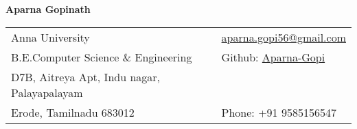 \documentclass[letterpaper,11pt,oneside]{article}
\newcommand*{\Github}{\href{https://github.com/Aparna-Gopi}{Aparna-Gopi}}
\newcommand{\Absender}[1][\normalsize]{\Github}
\begin{document}

\noindent  \LARGE{\textbf{Aparna Gopinath}}  \\
\vspace{-2ex}
\hline
\normalsize


\begin{center}
\begin{tabular}{l l}
 Anna University    & \hspace{1in} \href{mailto:aparna.gopi56@gmail.com}{aparna.gopi56@gmail.com} \\
 B.E.Computer Science \& Engineering  & \hspace{1in} Github: \Absender        \\
 D7B, Aitreya Apt, Indu nagar, Palayapalayam            \\
 Erode, Tamilnadu 683012 & \hspace{1in} Phone: +91 9585156547 \\
\end{tabular}
\end{center}

\vspace{1em}

\end{document}
